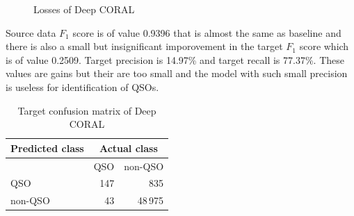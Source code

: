 \begin{figure}
\caption{Losses of Deep CORAL}
\label{deep_coral_training}
\end{figure}

Source data \(F_1\) score is of value 0.9396
that is almost the same as baseline
and there is also a small but insignificant imporovement in the target \(F_1\) score
which is of value 0.2509.
Target precision is 14.97\% and target recall is 77.37\%.
These values are gains but their are too small
and the model with such small precision is useless for identification of QSOs.

\begin{table}
\begin{center}
\begin{tabular}{|l|r|r|}
	\hline
	Predicted class & \multicolumn{2}{c|}{Actual class} \\
	\hline \hline
	& QSO & non-QSO \\ \hline
	QSO & 147 & 835 \\ \hline
	non-QSO & 43 & 48\,975 \\ \hline
\end{tabular}
\end{center}
\caption{Target confusion matrix of Deep CORAL}
\end{table}

